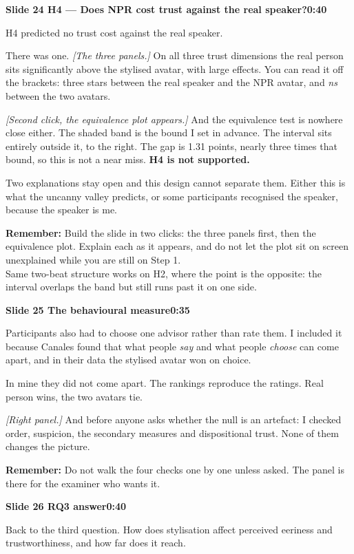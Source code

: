 \documentclass[11pt,a4paper]{article}
\newcommand{\slidehead}[3]{%
  \needspace{5\baselineskip}
  \vspace{0.9em}
  \noindent\colorbox{knblue}{\parbox{0.978\textwidth}{\vspace{1pt}\color{white}\textbf{Slide #1 \quad #2}\hfill\textbf{#3}\vspace{1pt}}}
  \vspace{0.35em}\par}
\newcommand{\remind}[1]{%
  \vspace{0.15em}
  \noindent\colorbox{knlight}{\parbox{0.972\textwidth}{\small\color{knblue}\textbf{Remember:} #1}}
  \vspace{0.2em}\par}
\newcommand{\pointto}[1]{{\color{knaccent}\textit{[#1]}}}
\begin{document}
\slidehead{24}{H4 — Does NPR cost trust against the real speaker?}{0:40}

H4 predicted no trust cost against the real speaker.

There was one. \pointto{The three panels.} On all three trust dimensions the real person sits significantly above the stylised avatar, with large effects. You can read it off the brackets: three stars between the real speaker and the NPR avatar, and \emph{ns} between the two avatars.

\pointto{Second click, the equivalence plot appears.} And the equivalence test is nowhere close either. The shaded band is the bound I set in advance. The interval sits entirely outside it, to the right. The gap is 1.31 points, nearly three times that bound, so this is not a near miss. \textbf{H4 is not supported.}

Two explanations stay open and this design cannot separate them. Either this is what the uncanny valley predicts, or some participants recognised the speaker, because the speaker is me.

\remind{Build the slide in two clicks: the three panels first, then the equivalence plot. Explain each as it appears, and do not let the plot sit on screen unexplained while you are still on Step 1.\\[0.4em] Same two-beat structure works on H2, where the point is the opposite: the interval overlaps the band but still runs past it on one side.}

\slidehead{25}{The behavioural measure}{0:35}

Participants also had to choose one advisor rather than rate them. I included it because Canales found that what people \emph{say} and what people \emph{choose} can come apart, and in their data the stylised avatar won on choice.

In mine they did not come apart. The rankings reproduce the ratings. Real person wins, the two avatars tie.

\pointto{Right panel.} And before anyone asks whether the null is an artefact: I checked order, suspicion, the secondary measures and dispositional trust. None of them changes the picture.

\remind{Do not walk the four checks one by one unless asked. The panel is there for the examiner who wants it.}

\slidehead{26}{RQ3 answer}{0:40}

Back to the third question. How does stylisation affect perceived eeriness and trustworthiness, and how far does it reach.
\end{document}
